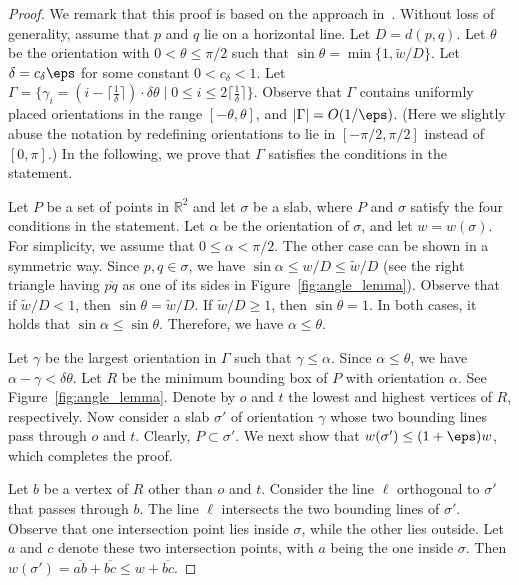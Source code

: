\begin{proof}
    We remark that this proof is based on the approach in~\cite{agarwalTwo}.
    Without loss of generality, assume that $p$ and $q$ lie on a horizontal line. 
    Let $D = d(p, q)$. 
    Let $\theta$ be the orientation with $0< \theta \le \pi/2$ such that $\sin\theta = \min \{1, \widetilde w/{D} \}$.
    Let $\delta =  c_\delta \eps$ for some constant $0 < c_\delta < 1$. 
    Let $\Gamma = \{\gamma_i = (i- \lceil \frac{1}{\delta}\rceil)\cdot \delta\theta  \mid 0 \le i \le 2\lceil \frac{1}{\delta}\rceil \}$.
    Observe that $\Gamma$ contains uniformly placed orientations in the range $[-\theta, \theta]$, and $|\Gamma| = O(1/\eps)$. (Here we slightly abuse the notation by redefining orientations to lie in $[-\pi/2, \pi/2]$ instead of $[0, \pi]$.)
    In the following, we prove that $\Gamma$ satisfies the conditions in the statement.

    Let $P$ be a set of points in $\mathbb{R}^2$ and let $\sigma$ be a slab, where $P$ and $\sigma$ satisfy the four conditions in the statement.
    Let $\alpha$ be the orientation of $\sigma$, and let $w = w(\sigma)$. 
    For simplicity, we assume that $0\le \alpha < \pi/2$. The other case can be shown in a symmetric way. 
    Since $p, q \in \sigma$, we have $\sin \alpha \le w/D \le \widetilde w/D$ (see the right triangle having $\overline{pq}$ as one of its sides in Figure~\ref{fig:angle_lemma}).
    Observe that if $\widetilde w/ D < 1$, then $\sin \theta = \widetilde w/ D$. If $\widetilde w/ D \ge 1$, then $\sin \theta =1$. In both cases, it holds that $\sin \alpha \le \sin \theta$. Therefore, we have $\alpha \le \theta$. 


     Let $\gamma$ be the largest orientation in $\Gamma$ such that $\gamma \le \alpha$. 
     Since $ \alpha \le  \theta$, we have $\alpha - \gamma < \delta \theta$. 
     Let $R$ be the minimum bounding box of $P$ with orientation $\alpha$. See Figure~\ref{fig:angle_lemma}.
     Denote by $o$ and $t$ the lowest and highest vertices of $R$, respectively. 
    Now consider a slab $\sigma'$ of orientation $\gamma$ whose two bounding lines pass through $o$ and $t$. 
    Clearly, $P \subset \sigma'$. 
    We next show that $w(\sigma') \le (1+\eps)w$, which completes the proof.

    Let $b$ be a vertex of $R$ other than $o$ and $t$. 
    Consider the line $\ell$ orthogonal to $\sigma'$ that passes through $b$. 
    The line $\ell$ intersects the two bounding lines of $\sigma'$. 
    Observe that one intersection point lies inside $\sigma$, while the other lies outside. 
    Let $a$ and $c$ denote these two intersection points, with $a$ being the one inside $\sigma$. 
    Then $w(\sigma') = \overline{ab} + \overline{bc} \le w + \overline{bc}$.


\end{proof}
